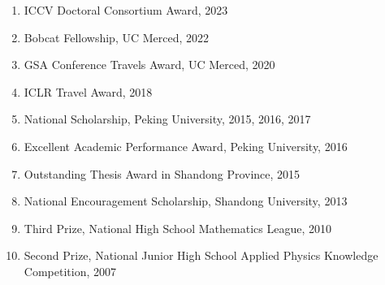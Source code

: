 \documentclass[letterpaper]{article}
\def\footerlink{http://jblevins.org/projects/cv-template/}
\begin{document}
\begin{enumerate}

\item ICCV Doctoral Consortium Award, 2023

\item Bobcat Fellowship, UC Merced, 2022

\item GSA Conference Travels Award, UC Merced, 2020

\item ICLR Travel Award, 2018

\item National Scholarship, Peking University, 2015, 2016, 2017

\item Excellent Academic Performance Award, Peking University, 2016

\item Outstanding Thesis Award in Shandong Province, 2015

\item National Encouragement Scholarship, Shandong University, 2013

\item Third Prize, National High School Mathematics League, 2010

\item Second Prize, National Junior High School Applied Physics Knowledge Competition, 2007


\end{enumerate}


\bigskip

\end{document}
